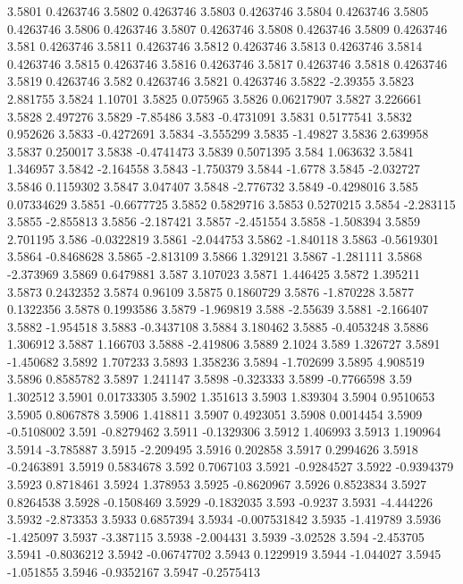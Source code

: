 3.5801  0.4263746
3.5802  0.4263746
3.5803  0.4263746
3.5804  0.4263746
3.5805  0.4263746
3.5806  0.4263746
3.5807  0.4263746
3.5808  0.4263746
3.5809  0.4263746
3.581  0.4263746
3.5811  0.4263746
3.5812  0.4263746
3.5813  0.4263746
3.5814  0.4263746
3.5815  0.4263746
3.5816  0.4263746
3.5817  0.4263746
3.5818  0.4263746
3.5819  0.4263746
3.582  0.4263746
3.5821  0.4263746
3.5822  -2.39355
3.5823  2.881755
3.5824  1.10701
3.5825  0.075965
3.5826  0.06217907
3.5827  3.226661
3.5828  2.497276
3.5829  -7.85486
3.583  -0.4731091
3.5831  0.5177541
3.5832  0.952626
3.5833  -0.4272691
3.5834  -3.555299
3.5835  -1.49827
3.5836  2.639958
3.5837  0.250017
3.5838  -0.4741473
3.5839  0.5071395
3.584  1.063632
3.5841  1.346957
3.5842  -2.164558
3.5843  -1.750379
3.5844  -1.6778
3.5845  -2.032727
3.5846  0.1159302
3.5847  3.047407
3.5848  -2.776732
3.5849  -0.4298016
3.585  0.07334629
3.5851  -0.6677725
3.5852  0.5829716
3.5853  0.5270215
3.5854  -2.283115
3.5855  -2.855813
3.5856  -2.187421
3.5857  -2.451554
3.5858  -1.508394
3.5859  2.701195
3.586  -0.0322819
3.5861  -2.044753
3.5862  -1.840118
3.5863  -0.5619301
3.5864  -0.8468628
3.5865  -2.813109
3.5866  1.329121
3.5867  -1.281111
3.5868  -2.373969
3.5869  0.6479881
3.587  3.107023
3.5871  1.446425
3.5872  1.395211
3.5873  0.2432352
3.5874  0.96109
3.5875  0.1860729
3.5876  -1.870228
3.5877  0.1322356
3.5878  0.1993586
3.5879  -1.969819
3.588  -2.55639
3.5881  -2.166407
3.5882  -1.954518
3.5883  -0.3437108
3.5884  3.180462
3.5885  -0.4053248
3.5886  1.306912
3.5887  1.166703
3.5888  -2.419806
3.5889  2.1024
3.589  1.326727
3.5891  -1.450682
3.5892  1.707233
3.5893  1.358236
3.5894  -1.702699
3.5895  4.908519
3.5896  0.8585782
3.5897  1.241147
3.5898  -0.323333
3.5899  -0.7766598
3.59  1.302512
3.5901  0.01733305
3.5902  1.351613
3.5903  1.839304
3.5904  0.9510653
3.5905  0.8067878
3.5906  1.418811
3.5907  0.4923051
3.5908  0.0014454
3.5909  -0.5108002
3.591  -0.8279462
3.5911  -0.1329306
3.5912  1.406993
3.5913  1.190964
3.5914  -3.785887
3.5915  -2.209495
3.5916  0.202858
3.5917  0.2994626
3.5918  -0.2463891
3.5919  0.5834678
3.592  0.7067103
3.5921  -0.9284527
3.5922  -0.9394379
3.5923  0.8718461
3.5924  1.378953
3.5925  -0.8620967
3.5926  0.8523834
3.5927  0.8264538
3.5928  -0.1508469
3.5929  -0.1832035
3.593  -0.9237
3.5931  -4.444226
3.5932  -2.873353
3.5933  0.6857394
3.5934  -0.007531842
3.5935  -1.419789
3.5936  -1.425097
3.5937  -3.387115
3.5938  -2.004431
3.5939  -3.02528
3.594  -2.453705
3.5941  -0.8036212
3.5942  -0.06747702
3.5943  0.1229919
3.5944  -1.044027
3.5945  -1.051855
3.5946  -0.9352167
3.5947  -0.2575413
